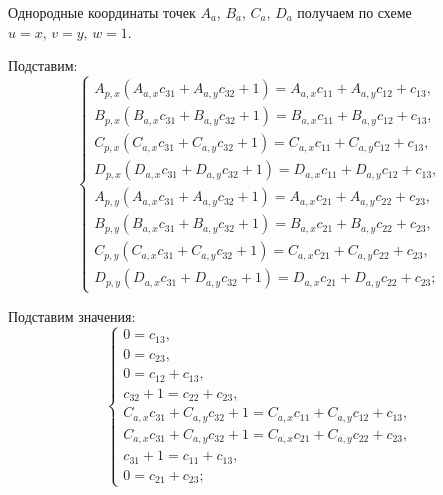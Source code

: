 Однородные координаты точек $A_a$, $B_a$, $C_a$, $D_a$ получаем по схеме $u=x,\,v=y,\,w=1$.

Подставим:
\begin{equation*}
	\begin{cases}
		A_{p,x}\left( A_{a,x} c_{31} + A_{a,y} c_{32} + 1 \right) = A_{a,x} c_{11} + A_{a,y} c_{12} + c_{13},\\
		B_{p,x}\left( B_{a,x} c_{31} + B_{a,y} c_{32} + 1 \right) = B_{a,x} c_{11} + B_{a,y} c_{12} + c_{13},\\
		C_{p,x}\left( C_{a,x} c_{31} + C_{a,y} c_{32} + 1 \right) = C_{a,x} c_{11} + C_{a,y} c_{12} + c_{13},\\
		D_{p,x}\left( D_{a,x} c_{31} + D_{a,y} c_{32} + 1 \right) = D_{a,x} c_{11} + D_{a,y} c_{12} + c_{13},\\
		A_{p,y}\left( A_{a,x} c_{31} + A_{a,y} c_{32} + 1 \right) = A_{a,x} c_{21} + A_{a,y} c_{22} + c_{23},\\
		B_{p,y}\left( B_{a,x} c_{31} + B_{a,y} c_{32} + 1 \right) = B_{a,x} c_{21} + B_{a,y} c_{22} + c_{23},\\
		C_{p,y}\left( C_{a,x} c_{31} + C_{a,y} c_{32} + 1 \right) = C_{a,x} c_{21} + C_{a,y} c_{22} + c_{23},\\
		D_{p,y}\left( D_{a,x} c_{31} + D_{a,y} c_{32} + 1 \right) = D_{a,x} c_{21} + D_{a,y} c_{22} + c_{23};
	\end{cases}
\end{equation*}

Подставим значения:
\begin{equation*}
	\begin{cases}
		0 = c_{13},\\
		0 = c_{23},\\
		0 = c_{12} + c_{13},\\
		c_{32} + 1 = c_{22} + c_{23},\\
		C_{a,x} c_{31} + C_{a,y} c_{32} + 1 = C_{a,x} c_{11} + C_{a,y} c_{12} + c_{13},\\
		C_{a,x} c_{31} + C_{a,y} c_{32} + 1 = C_{a,x} c_{21} + C_{a,y} c_{22} + c_{23},\\
		c_{31} + 1 = c_{11} + c_{13},\\
		0 = c_{21} + c_{23};
	\end{cases}
\end{equation*}

